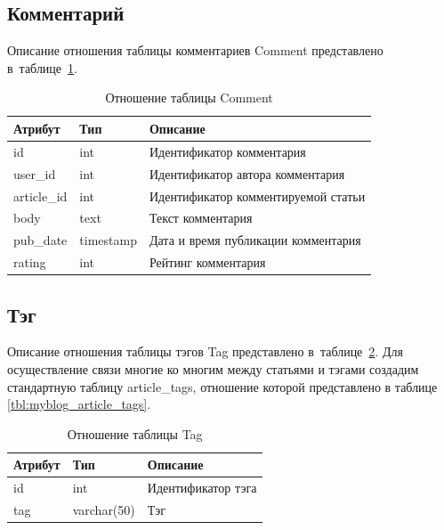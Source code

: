 \subsection{Комментарий}

Описание отношения таблицы комментариев Comment представлено в~таблице~\ref{tbl:myblog_comment}.

\begin{table}[H]
	\centering
	\caption{Отношение таблицы Comment}
	\label{tbl:myblog_comment}
	\begin{tabular}{|l|l|l|}
		\hline
		\textbf{Атрибут} & \textbf{Тип} & \textbf{Описание}                   \\ \hline
		id               & int          & Идентификатор комментария           \\ \hline
		user\_id         & int          & Идентификатор автора комментария    \\ \hline
		article\_id      & int          & Идентификатор комментируемой статьи \\ \hline
		body             & text         & Текст комментария                   \\ \hline
		pub\_date        & timestamp    & Дата и время публикации комментария \\ \hline
		rating           & int          & Рейтинг комментария                 \\ \hline
	\end{tabular}
\end{table}

\subsection{Тэг}

Описание отношения таблицы тэгов Tag представлено в~таблице~\ref{tbl:myblog_tag}.
Для осуществление связи многие ко многим между статьями и тэгами создадим стандартную таблицу article\_tags, отношение которой представлено в таблице \ref{tbl:myblog_article_tags}.

\begin{table}[H]
	\centering
	\caption{Отношение таблицы Tag}
	\label{tbl:myblog_tag}
	\begin{tabular}{|l|l|l|}
		\hline
		\textbf{Атрибут} & \textbf{Тип} & \textbf{Описание}  \\ \hline
		id               & int          & Идентификатор тэга \\ \hline
		tag              & varchar(50)  & Тэг                \\ \hline
	\end{tabular}
\end{table}


